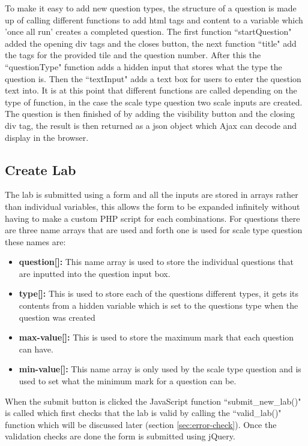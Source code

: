 \documentclass[11pt]{report}
\begin{document}
\noindent To make it easy to add  new question types, the structure of a question is made up of calling different functions to add html tags and content to a variable which 'once all run' creates a completed question. The first function ``startQuestion" added the opening div tags and the closes button, the next function ``title" add the tags for the provided tile and the question number. After this the ``questionType" function adds a hidden input that stores what the type the question is. Then the ``textInput" adds a text box for users to enter the question text into. It is at this point that different functions are called depending on the type of function, in the case the scale type question two scale inputs are created. The question is then finished of by adding the visibility button and the closing div tag, the result is then returned as a json object which Ajax can decode and display in the browser. 





\subsection{Create Lab}

The lab is submitted using a form and all the inputs are  stored in arrays rather than individual variables, this allows the form to be expanded infinitely without having to make a custom PHP script for each combinations. For questions there are three name arrays that are used and forth one is used for scale type question these names are:

\begin{itemize}
    \item \textbf{question[]:} This name array is used to store the individual questions that are inputted into the question input box. 
    \item \textbf{type[]:} This is used to store each of the questions different types, it gets its contents from a hidden variable which is set to the questions type when the question was created
    \item \textbf{max-value[]:} This is used to store the maximum mark that each question can have.
    \item \textbf{min-value[]:} This name array is only used by the scale type question and is used to set what the minimum mark for a question can be.
\end{itemize}

When the submit button is clicked the JavaScript function ``submit\_new\_lab()" is called which first checks that the lab is valid by calling the ``valid\_lab()" function which will be discussed later (section \ref{sec:error-check}). Once the validation checks are done the form is submitted using jQuery. 
\end{document}
